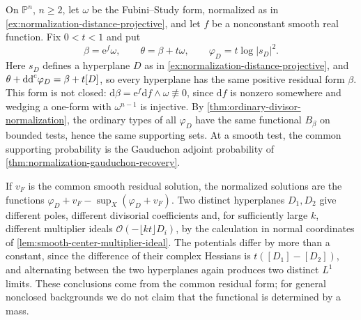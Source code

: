 \begin{example}\label{ex:nonclosed-normalization-nonseparation}
On $\mathbb P^n$, $n\geq2$, let $\omega$ be the Fubini--Study form, normalized as in \cref{ex:normalization-distance-projective}, and let $f$ be a nonconstant smooth real function. Fix $0<t<1$ and put
\[
 \beta=\mathrm{e}^f\omega,\qquad \theta=\beta+t\omega,\qquad \varphi_D=t\log|s_D|^2.
\]
Here $s_D$ defines a hyperplane $D$ as in \cref{ex:normalization-distance-projective}, and $\theta+\mathrm{dd}^{\mathrm{c}}\varphi_D=\beta+t[D]$, so every hyperplane has the same positive residual form $\beta$. This form is not closed: $\mathrm{d}\beta=\mathrm{e}^f\mathrm{d}f\wedge\omega\not\equiv0$, since $\mathrm{d}f$ is nonzero somewhere and wedging a one-form with $\omega^{n-1}$ is injective. By \cref{thm:ordinary-divisor-normalization}, the ordinary types of all $\varphi_D$ have the same functional $B_\beta$ on bounded tests, hence the same supporting sets. At a smooth test, the common supporting probability is the Gauduchon adjoint probability of \cref{thm:normalization-gauduchon-recovery}.

If $v_F$ is the common smooth residual solution, the normalized solutions are the functions $\varphi_D+v_F-\sup_X(\varphi_D+v_F)$. Two distinct hyperplanes $D_1,D_2$ give different poles, different divisorial coefficients and, for sufficiently large $k$, different multiplier ideals $\mathcal O(-\lfloor kt\rfloor D_i)$, by the calculation in normal coordinates of \cref{lem:smooth-center-multiplier-ideal}. The potentials differ by more than a constant, since the difference of their complex Hessians is $t([D_1]-[D_2])$, and alternating between the two hyperplanes again produces two distinct $L^1$ limits. These conclusions come from the common residual form; for general nonclosed backgrounds we do not claim that the functional is determined by a mass.
\end{example}
